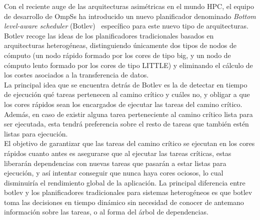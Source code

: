 
Con el reciente auge de las arquitecturas asimétricas en el mundo HPC, el
equipo de desarrollo de OmpSs ha introducido un nuevo planificador
denominado \emph{Bottom level-aware scheduler} (Botlev)~\cite{botlev}
específico para este nuevo tipo de arquitecturas. Botlev recoge las ideas
de los planificadores tradicionales basados en arquitecturas heterogéneas,
distinguiendo únicamente dos tipos de nodos de cómputo (un nodo rápido
formado por los cores de tipo big, y un nodo de cómputo lento formado por
los cores de tipo LITTLE) y eliminando el
cálculo de los costes asociados a la transferencia de datos. \\
La principal idea que se encuentra detrás de Botlev es la de detectar en
tiempo de ejecución qué tareas pertenecen al camino crítico y cuáles no, y
obligar a que los cores rápidos sean los encargados de ejecutar las tareas
del camino crítico. Además, en caso de existir alguna tarea perteneciente
al camino crítico lista para ser ejecutada, esta tendrá preferencia sobre
el resto de tareas que también estén listas para ejecución.\\
El objetivo de garantizar que las tareas del camino crítico se ejecutan en
los cores rápidos cuanto antes es asegurarse que al ejecutar las tareas
críticas, estas liberarán dependencias con nuevas tareas que pasarán a
estar listas para ejecución, y así intentar conseguir que nunca haya cores
ociosos, lo cual disminuiría el rendimiento global de la aplicación. La
principal diferencia entre botlev y los planificadores tradicionales para
sistemas heterogéneos es que botlev toma las decisiones en tiempo dinámico
sin necesidad de conocer de antemano información sobre las tareas, o al
forma del árbol de dependencias.


